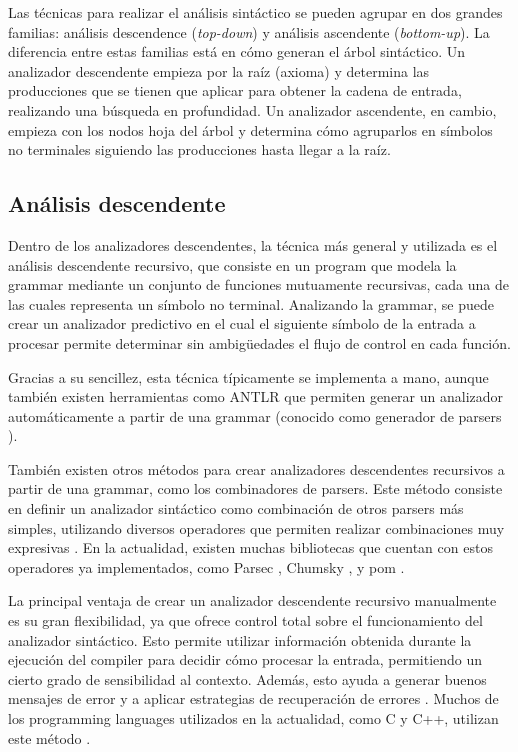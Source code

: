 Las técnicas para realizar el análisis sintáctico se pueden agrupar en dos
grandes familias: análisis descendence (\textit{top-down}) y análisis ascendente
(\textit{bottom-up}). La diferencia entre estas familias está en cómo generan el
árbol sintáctico. Un analizador descendente empieza por la raíz (axioma) y
determina las producciones que se tienen que aplicar para obtener la cadena de
entrada, realizando una búsqueda en profundidad. Un analizador ascendente, en
cambio, empieza con los nodos hoja del árbol y determina cómo agruparlos en
símbolos no terminales siguiendo las producciones hasta llegar a la raíz.
\parencite{dragon-book}

\subsection{Análisis descendente}

Dentro de los analizadores descendentes, la técnica más general y utilizada es
el análisis descendente recursivo, que consiste en un \gls{program} que modela la
\gls{grammar} mediante un conjunto de funciones mutuamente recursivas, cada una
de las cuales representa un símbolo no terminal. Analizando la \gls{grammar}, se
puede crear un analizador predictivo en el cual el siguiente símbolo de la
entrada a procesar permite determinar sin ambigüedades el flujo de control en
cada función. \parencite{dragon-book}

Gracias a su sencillez, esta técnica típicamente se implementa a mano, aunque
también existen herramientas como ANTLR \parencite{ANTLR} que permiten generar
un analizador automáticamente a partir de una \gls{grammar} (conocido como
generador de \glspl{parser} \parencite{dragon-book}).

También existen otros métodos para crear analizadores descendentes
recursivos a partir de una \gls{grammar}, como los combinadores de
\glspl{parser}. Este método consiste en definir un analizador sintáctico como
combinación de otros \glspl{parser} más simples, utilizando diversos operadores
que permiten realizar combinaciones muy expresivas
\parencite{parser-combinators}. En la actualidad, existen muchas bibliotecas que
cuentan con estos operadores ya implementados, como Parsec \parencite{parsec}, Chumsky
\parencite{chumsky}, y pom \parencite{pom}.

La principal ventaja de crear un analizador descendente recursivo manualmente es su
gran flexibilidad, ya que ofrece control total sobre el funcionamiento del
analizador sintáctico. Esto permite utilizar información obtenida durante la
ejecución del \gls{compiler} para decidir cómo procesar la entrada, permitiendo
un cierto grado de sensibilidad al contexto. Además, esto ayuda a generar buenos
mensajes de error y a aplicar estrategias de recuperación de errores
\parencite{errors-clang}. Muchos de los \glspl{programming language} utilizados
en la actualidad, como C y C++, utilizan este método
\parencite{parser-types-survey}.

